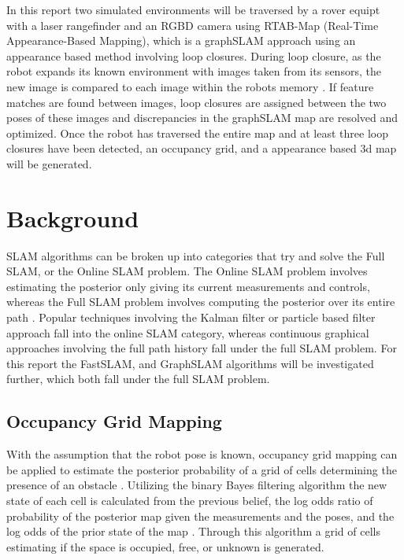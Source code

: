 \documentclass[10pt,journal,compsoc]{IEEEtran}
\begin{document}
In this report two simulated environments will be traversed by a rover equipt with a laser rangefinder and an RGBD camera using RTAB-Map (Real-Time Appearance-Based Mapping), which is a graphSLAM approach using an appearance based method involving loop closures. During loop closure, as the robot expands its known environment with images taken from its sensors, the new image is compared to each image within the robots memory \cite{UdacityLesson18}. If feature matches are found between images, loop closures are assigned between the two poses of these images and discrepancies in the graphSLAM map are resolved and optimized. Once the robot has traversed the entire map and at least three loop closures have been detected, an occupancy grid, and a appearance based 3d map will be generated.


\section{Background}
\label{sec:background}

SLAM algorithms can be broken up into categories that try and solve the Full SLAM, or the Online SLAM problem. The Online SLAM problem involves estimating the posterior only giving its current measurements and controls, whereas the Full SLAM problem involves computing the posterior over its entire path \cite{UdacityLesson17}. Popular techniques involving the Kalman filter or particle based filter approach fall into the online SLAM category, whereas continuous graphical approaches involving the full path history fall under the full SLAM problem. For this report the FastSLAM, and GraphSLAM algorithms will be investigated further, which both fall under the full SLAM problem.

\subsection{Occupancy Grid Mapping}
\label{subsec:occupancy}

With the assumption that the robot pose is known, occupancy grid mapping can be applied to estimate the posterior probability of a grid of cells determining the presence of an obstacle \cite{OccupancyWiki}. Utilizing the binary Bayes filtering algorithm the new state of each cell is calculated from the previous belief, the log odds ratio of probability of the posterior map given the measurements and the poses, and the log odds of the prior state of the map \cite{UdacityLesson16}. Through this algorithm a grid of cells estimating if the space is occupied, free, or unknown is generated.
\end{document}
